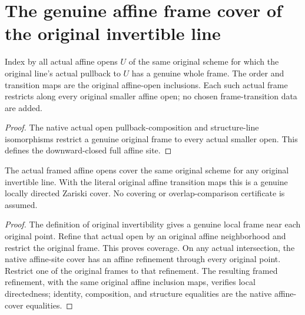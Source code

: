 \section{The genuine affine frame cover of the original invertible line}

\begin{definition}
\label{def:fc-original-line-framed-affine-site}
\leanok
{}
Index by all actual affine opens $U$ of the same original scheme for
which the original line's actual pullback to $U$ has a genuine whole
frame. The order and transition maps are the original affine-open
inclusions. Each such actual frame restricts along every original
smaller affine open; no chosen frame-transition data are added.
\end{definition}
\begin{proof}
The native actual open pullback-composition and structure-line
isomorphisms restrict a genuine original frame to every actual
smaller open. This defines the downward-closed full affine site.
\end{proof}

\begin{theorem}
\label{thm:fc-original-line-framed-affine-cover}
\leanok
{}
The actual framed affine opens cover the same original scheme for
any original invertible line. With the literal original affine
transition maps this is a genuine locally directed Zariski cover.
No covering or overlap-comparison certificate is assumed.
\end{theorem}
\begin{proof}
The definition of original invertibility gives a genuine local frame
near each original point. Refine that actual open by an original
affine neighborhood and restrict the original frame. This proves
coverage. On any actual intersection, the native affine-site cover
has an affine refinement through every original point. Restrict one
of the original frames to that refinement. The resulting framed
refinement, with the same original affine inclusion maps, verifies
local directedness; identity, composition, and structure equalities
are the native affine-cover equalities.
\end{proof}
